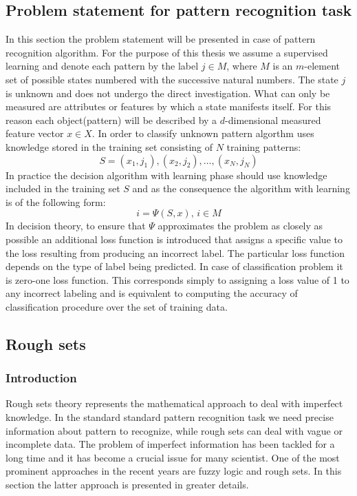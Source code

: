 \subsection{Problem statement for pattern recognition task}
\label{cha:Problem_statement}
In this section the problem statement will be presented in case of pattern
recognition algorithm. For the purpose of this thesis we assume a supervised learning and
denote each pattern by the label $j \in M$, where $M$ is an $m$-element set of
possible states numbered with the successive natural numbers. The state $j$ is
unknown and does not undergo the direct investigation. What can only be
measured are attributes or features by which a state manifests itself. For this
reason each object(pattern) will be described by a $d$-dimensional measured feature vector $x \in
X$. In order to classify unknown pattern algorthm uses knowledge stored in the training
set consisting of $N$ training patterns:
\begin{equation}
    S = (x_1, j_1), (x_2, j_2), \ldots, (x_N, j_N)
    \label{eq:training_pattern}
\end{equation}
In practice the decision algorithm  with learning phase should use knowledge included in the
training set $S$ and as the consequence the algorithm with learning is of the
following form:
\begin{equation}
    i=\Psi(S, x), \, i \in M
    \label{eq:decision_algorithm}
\end{equation}
In decision theory, to ensure that $\Psi$ approximates the problem as closely
as possible an additional loss function is introduced that assigns a specific
value to the loss resulting from producing an incorrect label. The particular loss
function depends on the type of label being predicted. In case of
classification problem it is zero-one loss function. This corresponds simply to
assigning a loss value of 1 to any incorrect labeling and is equivalent to computing
the accuracy of classification procedure over the set of training data.

\subsection{Rough sets}
\label{cha:Rough_set}
\subsubsection{Introduction}
\label{cha:Rough_set_introduction}
Rough sets theory represents the mathematical approach to deal with imperfect knowledge. 
In the standard standard pattern recognition task we need precise information about pattern to recognize, 
while rough sets can deal with vague or incomplete data. The problem of imperfect 
information has been tackled for a long time and it has become a crucial issue for many scientist.
One of the most prominent approaches in the recent years are fuzzy logic and rough sets.
In this section the latter approach is presented in greater details. 

